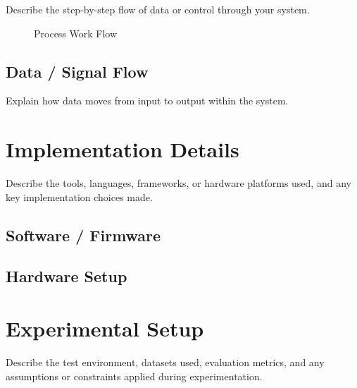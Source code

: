 Describe the step-by-step flow of data or control through your system.

\begin{figure}[htbp]
  \centering
  \caption{Process Work Flow}
  \label{fig:workflow}
\end{figure}

\subsection{Data / Signal Flow}
\label{subsec:dataflow}

Explain how data moves from input to output within the system.

\section{Implementation Details}
\label{sec:implementation}

Describe the tools, languages, frameworks, or hardware platforms used,
and any key implementation choices made.

\subsection{Software / Firmware}
\label{subsec:software}

\subsection{Hardware Setup}
\label{subsec:hardware}

\section{Experimental Setup}
\label{sec:expsetup}

Describe the test environment, datasets used, evaluation metrics, and
any assumptions or constraints applied during experimentation.
